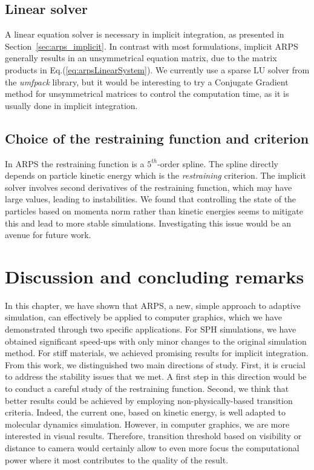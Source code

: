 \subsection{Linear solver}
A linear equation solver is necessary in implicit integration, as presented in Section~\ref{sec:arps_implicit}.
In contrast with most formulations, implicit ARPS generally results in an unsymmetrical equation matrix, due to the matrix products in Eq.(\ref{eq:arpsLinearSystem}).
We currently use a sparse LU solver from the \emph{umfpack} library, but it would be interesting to try a Conjugate Gradient method for unsymmetrical matrices to control the computation time, as it is usually done in implicit integration.

\subsection{Choice of the restraining function and criterion}
In ARPS the restraining function is a $5^{th}$-order spline.
The spline directly depends on particle kinetic energy which is the \emph{restraining} criterion.
The implicit solver involves second derivatives of the restraining function, which may have large values, leading to instabilities.
We found that controlling the state of the particles based on momenta norm rather than kinetic energies seems to mitigate this and lead to more stable simulations.
Investigating this issue would be an avenue for future work.

\section{Discussion and concluding remarks} 
\label{sec:arps_discussion}
In this chapter, we have shown that ARPS, a new, simple approach to adaptive simulation, can effectively be applied to computer graphics, which we have demonstrated through two specific applications.
For SPH simulations, we have obtained significant speed-ups with only minor changes to the original simulation method.
For stiff materials, we achieved promising results for implicit integration.
From this work, we distinguished two main directions of study.
First, it is crucial to address the stability issues that we met. 
A first step in this direction would be to conduct a careful study of the restraining function.
Second, we think that better results could be achieved by employing non-physically-based transition criteria. 
Indeed, the current one, based on kinetic energy, is well adapted to molecular dynamics simulation. 
However, in computer graphics, we are more interested in visual results.
Therefore, transition threshold based on visibility or distance to camera would certainly allow to even more focus the computational power where it most contributes to the quality of the result.
